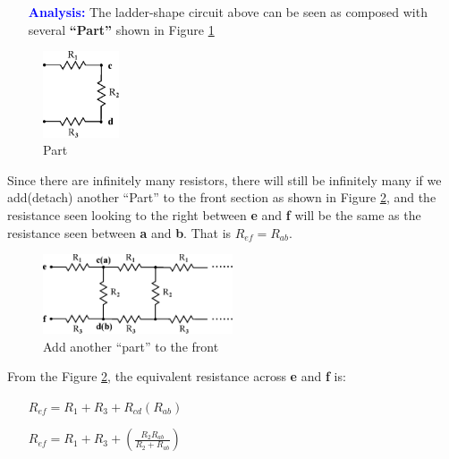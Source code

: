 \documentclass[a4 paper]{article}
\newcommand{\blue}[1]{\textcolor{blue}{#1}}
\numberwithin{equation}{section}
\newcommand{\0}{\mathbf{0}}
\begin{document}
\begin{itemize} \itemsep1pt \parskip0pt  
  \item[\blue{\bf Analysis:}] The ladder-shape circuit above can be seen as composed with several {\bf``Part''} shown in Figure \ref{equ_resisinf1part}
\end{itemize}


\begin{figure}[!ht]
  \caption{Part}
  \label{equ_resisinf1part}
  \centering
  \includegraphics[width=0.2\textwidth]{./images/equ_resisinf1part}
\end{figure}

Since there are infinitely many resistors, there will still be infinitely many if we add(detach) another ``Part'' to the front section as shown in Figure \ref{equ_resisinf1comb}, and the resistance seen looking to the right between {\bf e} and {\bf f} will be the same as the resistance seen between {\bf a} and {\bf b}. That is $R_{ef} = R_{ab}$.

\begin{figure}[!ht]
  \caption{Add another ``part'' to the front}
  \label{equ_resisinf1comb}
  \centering
  \includegraphics[width=0.5\textwidth]{./images/equ_resisinf1comb}
\end{figure}

From the Figure \ref{equ_resisinf1comb}, the equivalent resistance across {\bf e} and {\bf f} is:

\begin{itemize} \itemsep6pt \parskip0pt 
  \item[] \hspace{6 cm} $R_{ef} = R_1 + R_3 + R_{cd}(R_{ab})$
  \item[] \hspace{6 cm} $R_{ef} = R_1 + R_3 + (\frac{R_2R_{ab}}{R_2 + R_{ab}})$
\end{itemize}
\end{document}

